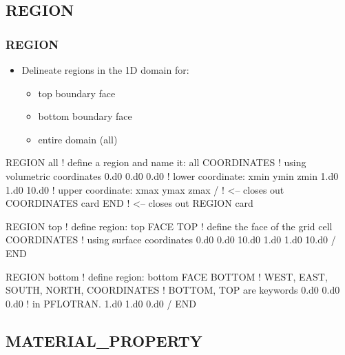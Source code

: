 \documentclass{beamer}
\newcommand\redcomment[1]{{{\color{red} #1}}}
\newcommand\bluecomment[1]{{{\color{blue} #1}}}
\newcommand\greencomment[1]{{{\color{green} #1}}}
\begin{document}
\subsection{REGION}

\begin{frame}\frametitle{REGION}

\begin{itemize}
  \item Delineate regions in the 1D domain for:
  \begin{itemize}
    \item top boundary face
    \item bottom boundary face
    \item entire domain (all)
  \end{itemize}
\end{itemize}

\begin{semiverbatim}
REGION all            \bluecomment{! define a region and name it: \greencomment{all}}
  COORDINATES         \bluecomment{! using \redcomment{volumetric} coordinates}
    0.d0 0.d0 0.d0    \bluecomment{! lower coordinate: xmin ymin zmin}
    1.d0 1.d0 10.d0   \bluecomment{! upper coordinate: xmax ymax zmax}
  /   \bluecomment{! <-- closes out COORDINATES card}
END   \bluecomment{! <-- closes out REGION card}

\newpage
REGION top            \bluecomment{! define region:} \greencomment{top}
  FACE TOP            \bluecomment{! define the face of the grid cell}
  COORDINATES         \bluecomment{! using \redcomment{surface} coordinates}
    0.d0 0.d0 10.d0
    1.d0 1.d0 10.d0
  /
END

REGION bottom         \bluecomment{! define region:} \greencomment{bottom}
  FACE BOTTOM         \redcomment{! WEST, EAST, SOUTH, NORTH,}
  COORDINATES         \redcomment{!   BOTTOM, TOP} \bluecomment{ are keywords}
    0.d0 0.d0 0.d0    \bluecomment{!   in PFLOTRAN.}
    1.d0 1.d0 0.d0
  /
END

\end{semiverbatim}

\end{frame}

\subsection{MATERIAL\_PROPERTY}
\end{document}

